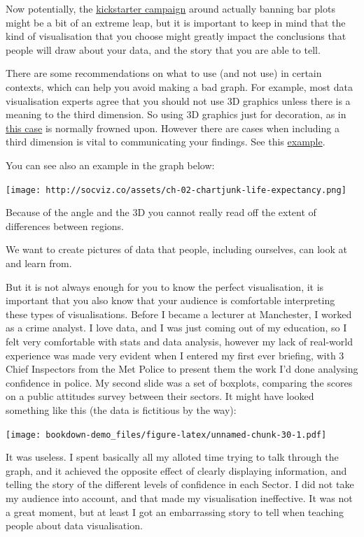 \documentclass[]{book}
\theoremstyle{definition}
\theoremstyle{definition}
\theoremstyle{definition}
\theoremstyle{remark}
\begin{document}
Now potentially, the
\href{https://www.kickstarter.com/projects/1474588473/barbarplots/description}{kickstarter
campaign} around actually banning bar plots might be a bit of an extreme
leap, but it is important to keep in mind that the kind of visualisation
that you choose might greatly impact the conclusions that people will
draw about your data, and the story that you are able to tell.

There are some recommendations on what to use (and not use) in certain
contexts, which can help you avoid making a bad graph. For example, most
data visualisation experts agree that you should not use 3D graphics
unless there is a meaning to the third dimension. So using 3D graphics
just for decoration, as in
\href{https://mir-s3-cdn-cf.behance.net/project_modules/disp/2505dd10837923.56030acd2ef20.jpg}{this
case} is normally frowned upon. However there are cases when including a
third dimension is vital to communicating your findings. See this
\href{http://www.visualisingdata.com/2015/03/when-3d-works/}{example}.

You can see also an example in the graph below:

\texttt{[image: http://socviz.co/assets/ch-02-chartjunk-life-expectancy.png]}

Because of the angle and the 3D you cannot really read off the extent of
differences between regions.

We want to create pictures of data that people, including ourselves, can
look at and learn from.

But it is not always enough for you to know the perfect visualisation,
it is important that you also know that your audience is comfortable
interpreting these types of visualisations. Before I became a lecturer
at Manchester, I worked as a crime analyst. I love data, and I was just
coming out of my education, so I felt very comfortable with stats and
data analysis, however my lack of real-world experience was made very
evident when I entered my first ever briefing, with 3 Chief Inspectors
from the Met Police to present them the work I'd done analysing
confidence in police. My second slide was a set of boxplots, comparing
the scores on a public attitudes survey between their sectors. It might
have looked something like this (the data is fictitious by the way):

\texttt{[image: bookdown-demo\_files/figure-latex/unnamed-chunk-30-1.pdf]}

It was useless. I spent basically all my alloted time trying to talk
through the graph, and it achieved the opposite effect of clearly
displaying information, and telling the story of the different levels of
confidence in each Sector. I did not take my audience into account, and
that made my visualisation ineffective. It was not a great moment, but
at least I got an embarrassing story to tell when teaching people about
data visualisation.
\end{document}

